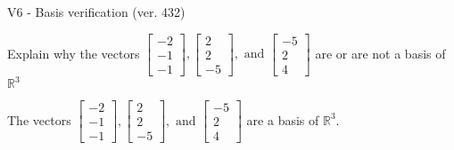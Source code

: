 \begin{exercise}
  \begin{exerciseTitle}V6 - Basis verification (ver. 432)\end{exerciseTitle}
  \begin{exerciseStatement}
    Explain why the vectors \(\left[\begin{array}{r}
-2 \\
-1 \\
-1
\end{array}\right] , \left[\begin{array}{r}
2 \\
2 \\
-5
\end{array}\right] , \text{ and } \left[\begin{array}{r}
-5 \\
2 \\
4
\end{array}\right]\) are or are not a basis of \(\mathbb{R}^3\)	


  \end{exerciseStatement}
  \begin{exerciseAnswer}
   The vectors \(\left[\begin{array}{r}
-2 \\
-1 \\
-1
\end{array}\right] , \left[\begin{array}{r}
2 \\
2 \\
-5
\end{array}\right] , \text{ and } \left[\begin{array}{r}
-5 \\
2 \\
4
\end{array}\right]\) 
  	 are  a basis of \(\mathbb{R}^3\).
  


  \end{exerciseAnswer}
\end{exercise}